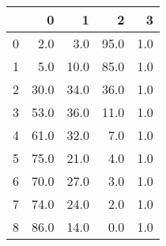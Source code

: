 \begin{tabular}{lrrrr}
\toprule
{} &     0 &     1 &     2 &    3 \\
\midrule
0 &   2.0 &   3.0 &  95.0 &  1.0 \\
1 &   5.0 &  10.0 &  85.0 &  1.0 \\
2 &  30.0 &  34.0 &  36.0 &  1.0 \\
3 &  53.0 &  36.0 &  11.0 &  1.0 \\
4 &  61.0 &  32.0 &   7.0 &  1.0 \\
5 &  75.0 &  21.0 &   4.0 &  1.0 \\
6 &  70.0 &  27.0 &   3.0 &  1.0 \\
7 &  74.0 &  24.0 &   2.0 &  1.0 \\
8 &  86.0 &  14.0 &   0.0 &  1.0 \\
\bottomrule
\end{tabular}

